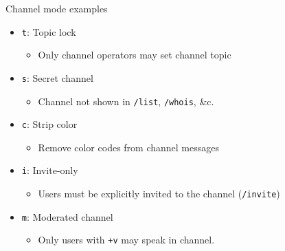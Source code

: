 \documentclass{beamer}
\begin{document}
\begin{frame}{Channel mode examples}
\begin{itemize}
	\item \texttt{t}: Topic lock
	\begin{itemize}
		\item Only channel operators may set channel topic
	\end{itemize}
	\item \texttt{s}: Secret channel
	\begin{itemize}
		\item Channel not shown in \texttt{/list}, \texttt{/whois}, \&c.
	\end{itemize}
	\item \texttt{c}: Strip color
	\begin{itemize}
		\item Remove color codes from channel messages
	\end{itemize}
	\item \texttt{i}: Invite-only
	\begin{itemize}
		\item Users must be explicitly invited to the channel (\texttt{/invite})
	\end{itemize}
	\item \texttt{m}: Moderated channel
	\begin{itemize}
		\item Only users with \texttt{+v} may speak in channel.
	\end{itemize}
\end{itemize}
\end{frame}
\end{document}
